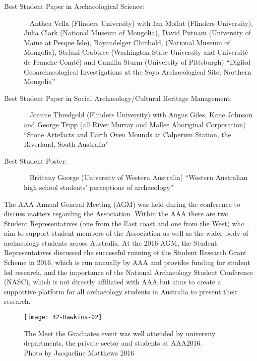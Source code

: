 \begin{description}
\item[Best Student Paper in Archaeological Science:]~\newline
	Anthea Vella (Flinders University) with Ian Moffat (Flinders University),
	Julia Clark (National Museum of Mongolia),
	David Putnam (University of Maine at Pesque Isle),
	Bayandelger Chinbold, (National Museum of Mongolia),
	Stefani Crabtree (Washington State University and Université de Franche-Comté) and Camilla Sturm (University of Pittsburgh)
	\enquote{Digital Geoarchaeological Investigations at the Soyo Archaeological Site, Northern Mongolia}
	
\item[Best Student Paper in Social Archaeology/Cultural Heritage Management:]~\newline
Joanne Thredgold (Flinders University) with Angus Giles,
Kane Johnson and George Tripp (all River Murray and Mallee Aboriginal Corporation) \enquote{Stone Artefacts and Earth Oven Mounds at Calperum Station,
the Riverland, South Australia}

\item[Best Student Poster:]~\newline
Brittany George (University of Western Australia)
\enquote{Western Australian high school students’ perceptions of archaeology}
\end{description}

The AAA Annual General Meeting (AGM) was held during the conference to discuss matters regarding the Association. Within the AAA there are two Student Representatives (one from the East coast and one from the West) who aim to support student members of the Association as well as the wider body of archaeology students across Australia. At the 2016 AGM, the Student Representatives discussed the successful running of the Student Research Grant Scheme in 2016, which is run annually by AAA and provides funding for student led research, and the importance of the National Archaeology Student Conference (NASC), which is not directly affiliated with AAA but aims to create a supportive platform for all archaeology students in Australia to present their research.

 \begin{figure}[!htb]
 	\texttt{[image: 32-Hawkins-02]}
 	\caption{The Meet the Graduates event was well attended by university departments, the private sector and students at AAA2016.
 		{\normalfont\scriptsize \\ Photo by Jacqueline Matthews 2016
 	}}
 	\label{fig:32-Hawkins-02}
 \end{figure}
 
